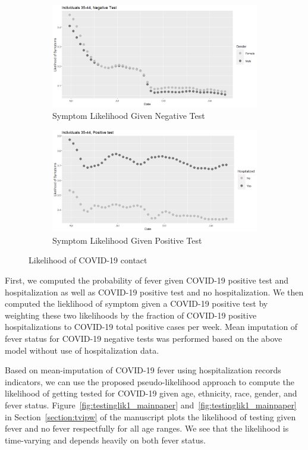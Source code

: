 \documentclass[11pt]{amsart}
\numberwithin{equation}{section}
\theoremstyle{plain}
\begin{document}
\begin{figure}[!th]
\centering
\begin{subfigure}{.5\textwidth}
 \centering
 \includegraphics[width=.9\linewidth]{../figs/tvprop_symptom_alt_fig1.png}
 \caption{Symptom Likelihood Given Negative Test}
 \label{fig:symptomlik1_model2}
\end{subfigure}%
\begin{subfigure}{.5\textwidth}
 \centering
\includegraphics[width=.9\linewidth]{../figs/tvprop_symptom_alt_fig2.png}
 \caption{Symptom Likelihood Given Positive Test}
 \label{fig:symptomlik2_model2}
\end{subfigure}
\caption{Likelihood of COVID-19 contact}
\label{fig:symptomlik_model2}
\end{figure}

First, we computed the probability of fever given COVID-19 positive test and hospitalization as well as COVID-19 positive test and no hospitalization.  We then computed the lieklihood of symptom given a COVID-19 positive test by weighting these two likelihoods by the fraction of COVID-19 positive hospitalizations to COVID-19 total positive cases per week.  Mean imputation of fever status for COVID-19 negative tests was performed based on the above model without use of hospitalization data.

Based on mean-imputation of COVID-19 fever using hospitalization records indicators, we can use the proposed pseudo-likelihood approach to compute the likelihood of getting tested for COVID-19 given age, ethnicity, race, gender, and fever status.  Figure~\ref{fig:testinglik1_mainpaper} and~\ref{fig:testinglik1_mainpaper} in Section~\ref{section:tvipw} of the manuscript plots the likelihood of testing given fever and no fever respectfully for all age ranges.  We see that the likelihood is time-varying and depends heavily on both fever status.
\end{document}
